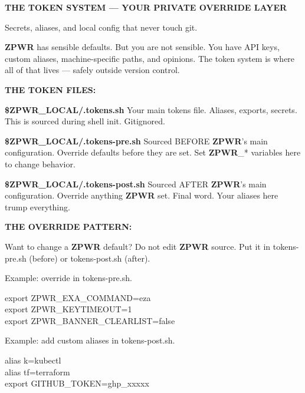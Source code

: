 \documentclass[11pt,a4paper,twoside]{book}
\begin{document}
\vspace{10pt}
{\large\bfseries\color{neoncyan} THE TOKEN SYSTEM — YOUR PRIVATE OVERRIDE LAYER}\vspace{6pt}

Secrets, aliases, and local config that never touch git.

\textbf{ZPWR} has sensible defaults. But you are not sensible. You have API keys, custom aliases, machine-specific paths, and opinions. The token system is where all of that lives — safely outside version control.


\vspace{12pt}
{\bfseries\color{neonyellow} THE TOKEN FILES:}\vspace{4pt}

\textbf{\$ZPWR\_LOCAL/.tokens.sh} Your main tokens file. Aliases, exports, secrets. This is sourced during shell init. Gitignored.

\textbf{\$ZPWR\_LOCAL/.tokens-pre.sh} Sourced BEFORE \textbf{ZPWR}'s main configuration. Override defaults before they are set. Set \textbf{ZPWR}\_* variables here to change behavior.

\textbf{\$ZPWR\_LOCAL/.tokens-post.sh} Sourced AFTER \textbf{ZPWR}'s main configuration. Override anything \textbf{ZPWR} set. Final word. Your aliases here trump everything.


\vspace{12pt}
{\bfseries\color{neonyellow} THE OVERRIDE PATTERN:}\vspace{4pt}

Want to change a \textbf{ZPWR} default? Do not edit \textbf{ZPWR} source. Put it in tokens-pre.sh (before) or tokens-post.sh (after).

Example: override in tokens-pre.sh.

\begin{codebox}
\color{neongreen}export ZPWR\_EXA\_COMMAND=eza\\
\color{neongreen}export ZPWR\_KEYTIMEOUT=1\\
\color{neongreen}export ZPWR\_BANNER\_CLEARLIST=false\\
\end{codebox}

Example: add custom aliases in tokens-post.sh.

\begin{codebox}
\color{neongreen}alias k=kubectl\\
\color{neongreen}alias tf=terraform\\
\color{neongreen}export GITHUB\_TOKEN=ghp\_xxxxx\\
\end{codebox}
\end{document}
